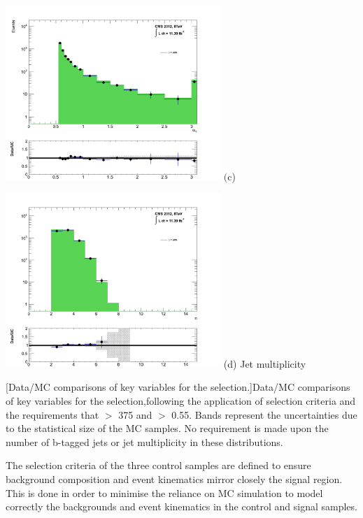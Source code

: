 \begin{itemize}
\xspace

\begin{minipage}{\linewidth}
\centering
\begin{minipage}{.48\textwidth}
\centering
\includegraphics[width = 3.2in]{plots/photon_alphat_datamc.pdf}
$\text{(c}$) \alphat
\end{minipage}
\begin{minipage}{.48\textwidth}
\centering
\includegraphics[width = 3.2in]{plots/photon_njet_datamc.pdf}
(d) Jet multiplicity
\end{minipage}
[Data/MC comparisons of key variables for the \gpjets selection.]{Data/MC comparisons of key variables for the \gpjets selection,following the application of selection criteria and the requirements that \theht $>$ 375 \GeV and \alphat $>$ 0.55. Bands represent the uncertainties due to the statistical size of the MC samples. No requirement is made upon the number of b-tagged jets or jet multiplicity in these distributions.}\label{fig:photonmcplots}
\end{minipage}

\end{itemize}

The selection criteria of the three control samples are defined to ensure background composition and event kinematics mirror closely the signal region. This is done in order to minimise the reliance on MC simulation to model correctly the backgrounds and event kinematics in the control and signal samples. 

